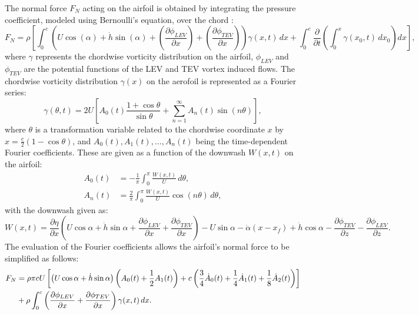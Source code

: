 \documentclass[a4paper,12pt]{article}
\begin{document}
The normal force \( F_N \) acting on the airfoil is obtained by integrating the pressure coefficient, modeled using Bernoulli’s equation, over the chord \citep{ramesh2014discrete}:
\begin{equation}
    F_N = \rho \left[ \int_0^c \left( U \cos(\alpha) + \dot{h} \sin(\alpha) + \left( \frac{\partial \phi_{LEV}}{\partial x} \right) + \left( \frac{\partial \phi_{TEV}}{\partial x} \right) \right) \gamma(x, t) \, dx
    + \int_0^c \frac{\partial}{\partial t} \left( \int_0^x \gamma(x_0, t) \, dx_0 \right) dx \right],
    \label{eq:FN_integral}
\end{equation}
where $\gamma$ represents the chordwise vorticity distribution on the airfoil, $\phi_{LEV}$ and $\phi_{TEV}$ are the potential functions of the LEV and TEV vortex induced flows. The chordwise vorticity distribution $\gamma(x)$ on the aerofoil is represented as a Fourier series:
\begin{equation}
    \gamma(\theta, t) = 2U \left[ A_0(t) \frac{1 + \cos\theta}{\sin\theta} + \sum_{n=1}^{\infty} A_n(t) \sin(n\theta) \right],
    \label{eq:gamma_fourier}
\end{equation}
where $\theta$ is a transformation variable related to the chordwise coordinate $x$ by $x = \frac{c}{2} (1 - \cos\theta)$, and $A_0(t), A_1(t), \ldots, A_n(t)$ being the time-dependent Fourier coefficients.
These are given as a function of the downwash $W(x, t)$ on the airfoil:
\begin{align}
    A_0(t) &= -\frac{1}{\pi} \int_0^{\pi} \frac{W(x, t)}{U} \, d\theta, \label{eq:A0}\\
    A_n(t) &= \frac{2}{\pi} \int_0^{\pi} \frac{W(x, t)}{U} \cos(n\theta) \, d\theta, \label{eq:An}
\end{align}
with the downwash given as:
\begin{equation}
    W(x, t) = \frac{\partial \eta}{\partial x} \left( U \cos\alpha + \dot{h} \sin\alpha + \frac{\partial \phi_{LEV}}{\partial x} + \frac{\partial \phi_{TEV}}{\partial x} \right)
    - U \sin\alpha - \dot{\alpha} (x - x_f) + \dot{h} \cos\alpha - \frac{\partial \phi_{TEV}}{\partial z} - \frac{\partial \phi_{LEV}}{\partial z}.
    \label{eq:W}
\end{equation}
The evaluation of the Fourier coefficients allows the airfoil's normal force to be simplified as follows:
\begin{align}
    F_N &= \rho \pi c U \left[ \left( U \cos\alpha + \dot{h} \sin\alpha \right) \left( A_0(t) + \frac{1}{2}A_1(t) \right)
    + c \left( \frac{3}{4} \dot{A}_0(t) + \frac{1}{4} \dot{A}_1(t) + \frac{1}{8} \dot{A}_2(t) \right) \right]\notag \\
    &+ \rho \int_0^c \left( \frac{\partial \phi_{LEV}}{\partial x} + \frac{\partial \phi_{TEV}}{\partial x} \right) \gamma(x, t) \, dx.
    \label{eq:FN_fourier}
\end{align}
\end{document}
